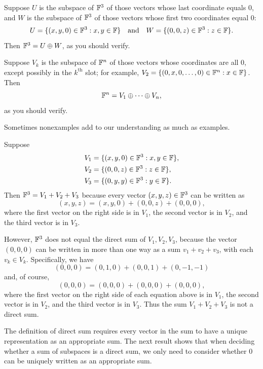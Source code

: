 \begin{example}\label{ax:1.42}
Suppose $U$ is the subspace of $\mathbb{F}^3$ of those vectors whose last coordinate
equals $0$, and $W$ is the subspace of $\mathbb{F}^3$ of those vectors whose first two
coordinates equal $0$:
\[ U = \{(x,y,0)\in\mathbb{F}^3 : x,y\in\mathbb{F}\} \quad\text{and}\quad
   W = \{(0,0,z)\in\mathbb{F}^3 : z\in\mathbb{F}\}. \]
Then $\mathbb{F}^3=U\oplus W$, as you should verify.
\end{example}

%
\begin{example}\label{ax:1.43}
Suppose $V_k$ is the subspace of $\mathbb{F}^n$ of those vectors whose coordinates are
all $0$, except possibly in the $k^{\text{th}}$ slot; for example,
$V_2=\{(0,x,0,\dots,0)\in\mathbb{F}^n : x\in\mathbb{F}\}$. Then
\[ \mathbb{F}^n = V_1\oplus\cdots\oplus V_n, \]
as you should verify.
\end{example}

Sometimes nonexamples add to our understanding as much as examples.

\begin{example}\label{ax:1.44}
Suppose
\begin{align*}
V_1 &= \{(x,y,0)\in\mathbb{F}^3 : x,y\in\mathbb{F}\},\\
V_2 &= \{(0,0,z)\in\mathbb{F}^3 : z\in\mathbb{F}\},\\
V_3 &= \{(0,y,y)\in\mathbb{F}^3 : y\in\mathbb{F}\}.
\end{align*}
Then $\mathbb{F}^3=V_1+V_2+V_3$ because every vector $(x,y,z)\in\mathbb{F}^3$ can be written as
\[ (x,y,z) = (x,y,0)+(0,0,z)+(0,0,0), \]
where the first vector on the right side is in $V_1$, the second vector is in
$V_2$, and the third vector is in $V_3$.

However, $\mathbb{F}^3$ does not equal the direct sum of $V_1,V_2,V_3$, because the
vector $(0,0,0)$ can be written in more than one way as a sum $v_1+v_2+v_3$,
with each $v_k\in V_k$. Specifically, we have
\[ (0,0,0) = (0,1,0)+(0,0,1)+(0,-1,-1) \]
and, of course,
\[ (0,0,0) = (0,0,0)+(0,0,0)+(0,0,0), \]
where the first vector on the right side of each equation above is in $V_1$,
the second vector is in $V_2$, and the third vector is in $V_3$. Thus the sum
$V_1+V_2+V_3$ is not a direct sum.
\end{example}

%
The definition of direct sum requires every vector in the sum to have a unique
representation as an appropriate sum. The next result shows that when deciding
whether a sum of subspaces is a direct sum, we only need to consider whether
$0$ can be uniquely written as an appropriate sum.

